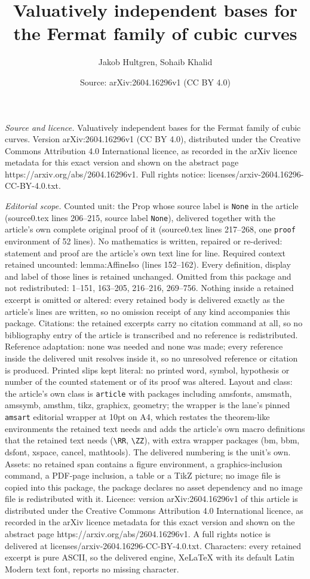 \documentclass[10pt,a4paper]{amsart}
\title[Valuatively independent bases for the Fermat family of cubic]{Valuatively independent bases for the Fermat family of cubic curves}
\author{Jakob Hultgren, Sohaib Khalid}
\date{Source: arXiv:2604.16296v1 (CC BY 4.0)}
\begin{document}
\maketitle

\noindent\emph{Source and licence.} Valuatively independent bases for the Fermat family of cubic curves. Version arXiv:2604.16296v1 (CC BY 4.0), distributed under the Creative Commons Attribution 4.0 International licence, as recorded in the arXiv licence metadata for this exact version and shown on the abstract page https://arxiv.org/abs/2604.16296v1. Full rights notice: licenses/arxiv-2604.16296-CC-BY-4.0.txt.\par\smallskip

\noindent\textit{Editorial scope.} Counted unit: the Prop whose source label is \texttt{None} in the article (source0.tex lines 206--215, source label \texttt{None}), delivered together with the article's own complete original proof of it (source0.tex lines 217--268, one \texttt{proof} environment of 52 lines). No mathematics is written, repaired or re-derived: statement and proof are the article's own text line for line. Required context retained uncounted: lemma:AffineIso (lines 152--162). Every definition, display and label of those lines is retained unchanged. Omitted from this package and not redistributed: 1--151, 163--205, 216--216, 269--756. Nothing inside a retained excerpt is omitted or altered: every retained body is delivered exactly as the article's lines are written, so no omission receipt of any kind accompanies this package. Citations: the retained excerpts carry no citation command at all, so no bibliography entry of the article is transcribed and no reference is redistributed. Reference adaptation: none was needed and none was made; every reference inside the delivered unit resolves inside it, so no unresolved reference or citation is produced. Printed slips kept literal: no printed word, symbol, hypothesis or number of the counted statement or of its proof was altered. Layout and class: the article's own class is \texttt{article} with packages including amsfonts, amsmath, amssymb, amsthm, tikz, graphicx, geometry; the wrapper is the lane's pinned \texttt{amsart} editorial wrapper at 10pt on A4, which restates the theorem-like environments the retained text needs and adds the article's own macro definitions that the retained text needs (\texttt{\textbackslash RR}, \texttt{\textbackslash ZZ}), with extra wrapper packages (bm, bbm, dsfont, xspace, cancel, mathtools). The delivered numbering is the unit's own. Assets: no retained span contains a figure environment, a graphics-inclusion command, a PDF-page inclusion, a table or a TikZ picture; no image file is copied into this package, the package declares no asset dependency and no image file is redistributed with it. Licence: version arXiv:2604.16296v1 of this article is distributed under the Creative Commons Attribution 4.0 International licence, as recorded in the arXiv licence metadata for this exact version and shown on the abstract page https://arxiv.org/abs/2604.16296v1. A full rights notice is delivered at licenses/arxiv-2604.16296-CC-BY-4.0.txt. Characters: every retained excerpt is pure ASCII, so the delivered engine, XeLaTeX with its default Latin Modern text font, reports no missing character.
\end{document}
